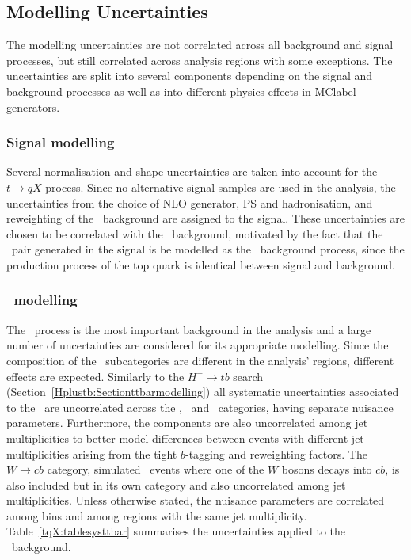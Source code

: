 \subsection{Modelling Uncertainties}
The modelling uncertainties are not correlated across all background and signal processes, but still correlated across analysis regions with some exceptions. The uncertainties are split into several components depending on the signal and background processes as well as into different physics effects in \acrshort{MClabel} generators. 

\subsubsection{Signal modelling}

Several normalisation and shape uncertainties are taken into account for the $t\to qX$ process. Since no alternative signal samples are used in the analysis, the uncertainties from the choice of NLO generator, PS and hadronisation, and reweighting of the \ttl\ background are assigned to the signal. These uncertainties are chosen to be correlated with the \ttl\ background, motivated by the fact that the \ttbar\ pair generated in the signal is be modelled as the \ttl\ background process, since the production process of the top quark is identical between signal and background. 

\subsubsection{\ttbar\ modelling}

The \ttbar\ process is the most important background in the analysis and a large number of uncertainties are considered for its appropriate modelling. Since the composition of the \ttbar\ subcategories are different in the analysis' regions, different effects are expected. Similarly to the $H^+\to tb$ search (Section~\ref{Hplustb:Sectionttbarmodelling}) all systematic uncertainties associated to the \ttbar\ are uncorrelated across the \ttb, \ttc\ and \ttl\ categories, having separate nuisance parameters. Furthermore, the components are also uncorrelated among jet multiplicities to better model differences between events with different jet multiplicities arising from the tight $b$-tagging and reweighting factors. The $W\to cb$ category, simulated \ttbar\ events where one of the $W$ bosons decays into $cb$, is also included but in its own category and also uncorrelated among jet multiplicities. Unless otherwise stated, the nuisance parameters are correlated among bins and among regions with the same jet multiplicity. Table~\ref{tqX:tablesysttbar} summarises the uncertainties applied to the \ttbar\ background. 

